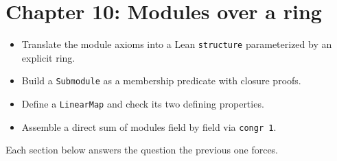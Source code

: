 \chapter{Chapter 10: Modules over a ring}\label{sec:10-modules:00-index:1}

\begin{learningobjectives}
\begin{itemize}
\tightlist
\item
  Translate the module axioms into a Lean \texttt{structure} parameterized by an explicit ring.
\item
  Build a \texttt{Submodule} as a membership predicate with closure proofs.
\item
  Define a \texttt{LinearMap} and check its two defining properties.
\item
  Assemble a direct sum of modules field by field via \texttt{congr 1}.
\end{itemize}
\end{learningobjectives}


Each section below answers the question the previous one forces.

